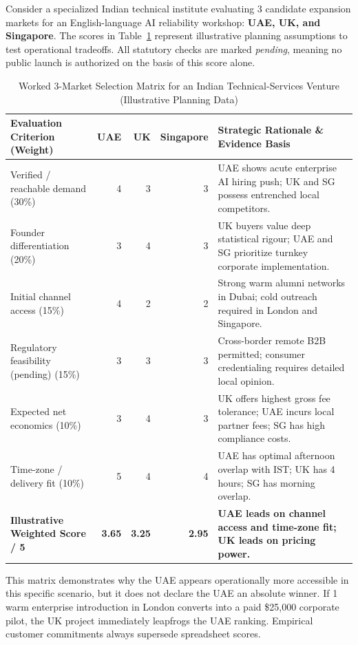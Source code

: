 Consider a specialized Indian technical institute evaluating 3 candidate expansion markets for an English-language AI reliability workshop: \textbf{UAE, UK, and Singapore}. The scores in Table~\ref{tab:worked_3market} represent illustrative planning assumptions to test operational tradeoffs. All statutory checks are marked \textit{pending}, meaning no public launch is authorized on the basis of this score alone.

\begin{table}[t]
\centering
\small
\caption{Worked 3-Market Selection Matrix for an Indian Technical-Services Venture (Illustrative Planning Data)}
\label{tab:worked_3market}
\begin{tabularx}{\textwidth}{p{4.2cm} r r r X}
\toprule
\textbf{Evaluation Criterion (Weight)} & \textbf{UAE} & \textbf{UK} & \textbf{Singapore} & \textbf{Strategic Rationale \& Evidence Basis} \\
\midrule
Verified / reachable demand (30\%) & 4 & 3 & 3 & UAE shows acute enterprise AI hiring push; UK and SG possess entrenched local competitors. \\
Founder differentiation (20\%) & 3 & 4 & 3 & UK buyers value deep statistical rigour; UAE and SG prioritize turnkey corporate implementation. \\
Initial channel access (15\%) & 4 & 2 & 2 & Strong warm alumni networks in Dubai; cold outreach required in London and Singapore. \\
Regulatory feasibility (pending) (15\%) & 3 & 3 & 3 & Cross-border remote B2B permitted; consumer credentialing requires detailed local opinion. \\
Expected net economics (10\%) & 3 & 4 & 3 & UK offers highest gross fee tolerance; UAE incurs local partner fees; SG has high compliance costs. \\
Time-zone / delivery fit (10\%) & 5 & 4 & 4 & UAE has optimal afternoon overlap with IST; UK has 4 hours; SG has morning overlap. \\
\midrule
\textbf{Illustrative Weighted Score / 5} & \textbf{3.65} & \textbf{3.25} & \textbf{2.95} & \textbf{UAE leads on channel access and time-zone fit; UK leads on pricing power.} \\
\bottomrule
\end{tabularx}
\end{table}

This matrix demonstrates why the UAE appears operationally more accessible in this specific scenario, but it does not declare the UAE an absolute winner. If 1 warm enterprise introduction in London converts into a paid \$25,000 corporate pilot, the UK project immediately leapfrogs the UAE ranking. Empirical customer commitments always supersede spreadsheet scores.

